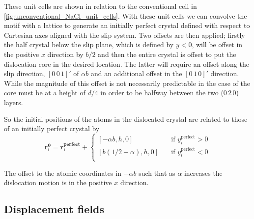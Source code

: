 These unit cells are shown in relation to the conventional cell in \autoref{fig:unconventional_NaCl_unit_cells}. With these unit cells we can convolve the motif with a lattice to generate an initially perfect crystal defined with respect to Cartesian axes aligned with the slip system. Two offsets are then applied; firstly the half crystal below the slip plane, which is defined by $y < 0$, will be offset in the positive $x$ direction by $b/2$ and then the entire crystal is offset to put the dislocation core in the desired location. The latter will require an offset along the slip direction, $[0\,0\,1]'$ of $\alpha b$ and an additional offset in the $[0\,1\,0]'$ direction. While the magnitude of this offset is not necessarily predictable in the case of  the core must be at a height of $d/4$ in order to be halfway between the two (0\,2\,0) layers.

So the initial positions of the atoms in the dislocated crystal are related to those of an initially perfect crystal by
\begin{equation}
\bm{r_i^0} = \bm{r_i^{\text{perfect}}} +\begin{cases}
[-\alpha{}b, h, 0] & \quad \text{if } y_i^{\text{perfect}} > 0\\
[b(1/2 - \alpha{}), h, 0] & \quad \text{if } y_i^{\text{perfect}} < 0\\
\end{cases} 
\end{equation}

The offset to the atomic coordinates in $-\alpha{}b$ such that as $\alpha$ increases the dislocation motion is in the positive $x$ direction.





\FloatBarrier














\subsection{Displacement fields}

